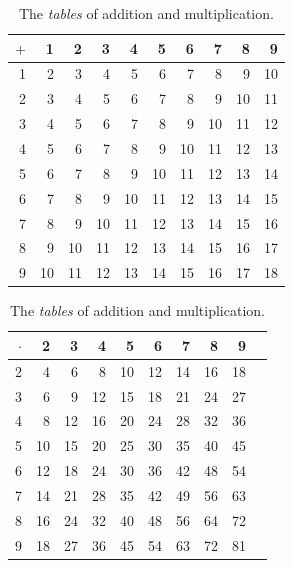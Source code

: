 \begin{table}
  \begin{center}
    \setlength{\tabcolsep}{3pt}
    \begin{tabular}{>{\small}r|>{\small}r>{\small}r>{\small}r>{\small}r>{\small}r>{\small}r>{\small}r>{\small}r>{\small}r}
      $+$       & 1 & 2 & 3 & 4 & 5 & 6 & 7 & 8 & 9 \\ \hline
      1         & 2 & 3 & 4 & 5 & 6 & 7 & 8 & 9 & 10 \\
      2         & 3 & 4 & 5 & 6 & 7 & 8 & 9 & 10 & 11 \\
      3         & 4 & 5 & 6 & 7 & 8 & 9 & 10 & 11 & 12 \\
      4         & 5 & 6 & 7 & 8 & 9 & 10 & 11 & 12 & 13 \\
      5         & 6 & 7 & 8 & 9 & 10 & 11 & 12 & 13 & 14 \\
      6         & 7 & 8 & 9 & 10 & 11 & 12 & 13 & 14 & 15 \\
      7         & 8 & 9 & 10 & 11 & 12 & 13 & 14 & 15 & 16 \\
      8         & 9 & 10 & 11 & 12 & 13 & 14 & 15 & 16 & 17 \\
      9         & 10 & 11 & 12 & 13 & 14 & 15 & 16 & 17 & 18
      \end{tabular}
      \qquad
      \begin{tabular}{>{\small}r|r>{\small}r>{\small}r>{\small}r>{\small}r>{\small}r>{\small}r>{\small}r>{\small}r}
        $\cdot$       & 2 & 3 & 4 & 5 & 6 & 7 & 8 & 9 \\ \hline
        2         & 4 & 6 & 8 & 10 & 12 & 14 & 16 & 18 \\
        3         & 6 & 9 & 12 & 15 & 18 & 21 & 24 & 27 \\
        4         & 8 & 12 & 16 & 20 & 24 & 28 & 32 & 36 \\
        5         & 10 & 15 & 20 & 25 & 30 & 35 & 40 & 45 \\
        6         & 12 & 18 & 24 & 30 & 36 & 42 & 48 & 54 \\
        7         & 14 & 21 & 28 & 35 & 42 & 49 & 56 & 63 \\
        8         & 16 & 24 & 32 & 40 & 48 & 56 & 64 & 72 \\
        9         & 18 & 27 & 36 & 45 & 54 & 63 & 72 & 81
      \end{tabular}
    \end{center}
    \caption{The \emph{tables} of addition and multiplication.}
    \label{tab:tabelline}
\end{table}

